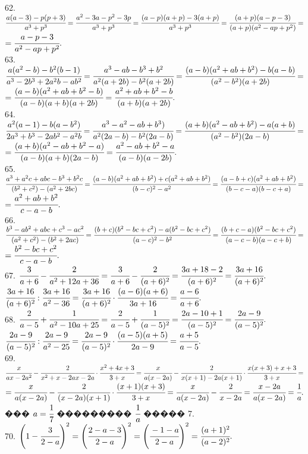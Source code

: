 \documentclass[12pt]{article}
\begin{document}
62. $\cfrac{a(a-3)-p(p+3)}{a^3+p^3}=\cfrac{a^2-3a-p^2-3p}{a^3+p^3}=\cfrac{(a-p)(a+p)-3(a+p)}{a^3+p^3}=\cfrac{(a+p)(a-p-3)}{(a+p)(a^2-ap+p^2)}=$\\$
=\cfrac{a-p-3}{a^2-ap+p^2}.$\\
63. $\cfrac{a(a^2-b)-b^2(b-1)}{a^3-2b^3+2a^2b-ab^2}=\cfrac{a^3-ab-b^3+b^2}{a^2(a+2b)-b^2(a+2b)}=
\cfrac{(a-b)(a^2+ab+b^2)-b(a-b)}{(a^2-b^2)(a+2b)}=$\\$=\cfrac{(a-b)(a^2+ab+b^2-b)}{(a-b)(a+b)(a+2b)}=
\cfrac{a^2+ab+b^2-b}{(a+b)(a+2b)}.$\\
64. $\cfrac{a^2(a-1)-b(a-b^2)}{2a^3+b^3-2ab^2-a^2b}=\cfrac{a^3-a^2-ab+b^3)}{a^2(2a-b)-b^2(2a-b)}=
\cfrac{(a+b)(a^2-ab+b^2)-a(a+b)}{(a^2-b^2)(2a-b)}=$\\$=\cfrac{(a+b)(a^2-ab+b^2-a)}{(a-b)(a+b)(2a-b)}=\cfrac{a^2-ab+b^2-a}{(a-b)(a-2b)}.$\\
65. $\cfrac{a^3+a^2c+abc-b^3+b^2c}{(b^2+c^2)-(a^2+2bc)}=\cfrac{(a-b)(a^2+ab+b^2)+c(a^2+ab+b^2)}{(b-c)^2-a^2}=
\cfrac{(a-b+c)(a^2+ab+b^2)}{(b-c-a)(b-c+a)}=$\\$=\cfrac{a^2+ab+b^2}{c-a-b}.$\\
66. $\cfrac{b^3-ab^2+abc+c^3-ac^2}{(a^2+c^2)-(b^2+2ac)}=\cfrac{(b+c)(b^2-bc+c^2)-a(b^2-bc+c^2)}{(a-c)^2-b^2}=
\cfrac{(b+c-a)(b^2-bc+c^2)}{(a-c-b)(a-c+b)}=$\\$=\cfrac{b^2-bc+c^2}{c-a-b}.$\\
67. $\cfrac{3}{a+6}-\cfrac{2}{a^2+12a+36}=\cfrac{3}{a+6}-\cfrac{2}{(a+6)^2}=\cfrac{3a+18-2}{(a+6)^2}=\cfrac{3a+16}{(a+6)^2}.$\\
$\cfrac{3a+16}{(a+6)^2}:\cfrac{3a+16}{a^2-36}=\cfrac{3a+16}{(a+6)^2}\cdot\cfrac{(a-6)(a+6)}{3a+16}=\cfrac{a-6}{a+6}.$\\
68. $\cfrac{2}{a-5}+\cfrac{1}{a^2-10a+25}=\cfrac{2}{a-5}+\cfrac{1}{(a-5)^2}=\cfrac{2a-10+1}{(a-5)^2}=\cfrac{2a-9}{(a-5)^2}.$\\
$\cfrac{2a-9}{(a-5)^2}:\cfrac{2a-9}{a^2-25}=\cfrac{2a-9}{(a-5)^2}\cdot\cfrac{(a-5)(a+5)}{2a-9}=\cfrac{a+5}{a-5}.$\\
69. $\cfrac{x}{ax-2a^2}-\cfrac{2}{x^2+x-2ax-2a}\cdot\cfrac{x^2+4x+3}{3+x}=\cfrac{x}{a(x-2a)}-\cfrac{2}{x(x+1)-2a(x+1)}\cdot\cfrac{x(x+3)+x+3}{3+x}=$\\$=
\cfrac{x}{a(x-2a)}-\cfrac{2}{(x-2a)(x+1)}\cdot\cfrac{(x+1)(x+3)}{3+x}=\cfrac{x}{a(x-2a)}-\cfrac{2}{x-2a}=
\cfrac{x-2a}{a(x-2a)}=\cfrac{1}{a}.$ ��� $a=\cfrac{1}{7}$ ��������� $\cfrac{1}{a}$ ����� 7.\\
70. $\left(1-\cfrac{3}{2-a}\right)^2=\left(\cfrac{2-a-3}{2-a}\right)^2=\left(\cfrac{-1-a}{2-a}\right)^2=\cfrac{(a+1)^2}{(a-2)^2}.$\\
\end{document}
